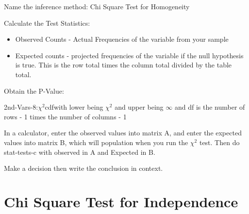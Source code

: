 \documentclass[../stats.tex]{subfiles}
\begin{document}
Name the inference method: Chi Square Test for Homogeneity

Calculate the Test Statistics:
\begin{itemize}
    \item Observed Counts - Actual Frequencies of the variable from your sample 
    \item Expected counts - projected frequencies of the variable if the null hypothesis is true. This is the row total times the column total divided by the table total.
\end{itemize}

Obtain the P-Value: 

2nd-Vars-8:$\chi^2$cdfwith lower being $\chi^2$ and upper being $\infty$ and df is the number of rows - 1 times the number of columns - 1

In a calculator, enter the observed values into matrix A, and enter the expected values into matrix B, which will population when you run the $\chi^2$ test. Then do stat-tests-c with observed in A and Expected in B.

Make a decision then write the conclusion in context.

\section{Chi Square Test for Independence}
\end{document}
